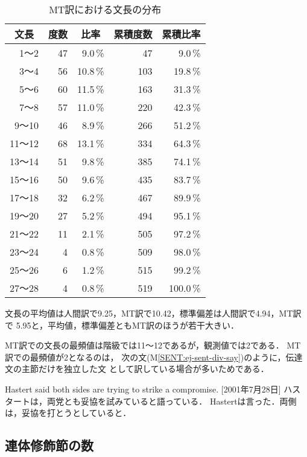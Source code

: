 \begin{table}[htbp]
\caption{MT訳における文長の分布}
\label{tab:sent-length-mt}
\begin{center}
\begin{tabular}{|r||r|r|r|r|}\hline
\multicolumn{1}{|c||}{文長} & \multicolumn{1}{c|}{度数} & 
\multicolumn{1}{c|}{比率} & \multicolumn{1}{c|}{累積度数} & 
\multicolumn{1}{c|}{累積比率} \\\hline\hline
   1〜2 & 47 &  9.0\,\% &  47 &  9.0\,\% \\
   3〜4 & 56 & 10.8\,\% & 103 & 19.8\,\% \\
   5〜6 & 60 & 11.5\,\% & 163 & 31.3\,\% \\
   7〜8 & 57 & 11.0\,\% & 220 & 42.3\,\% \\
  9〜10 & 46 &  8.9\,\% & 266 & 51.2\,\% \\
 11〜12 & 68 & 13.1\,\% & 334 & 64.3\,\% \\
 13〜14 & 51 &  9.8\,\% & 385 & 74.1\,\% \\
 15〜16 & 50 &  9.6\,\% & 435 & 83.7\,\% \\
 17〜18 & 32 &  6.2\,\% & 467 & 89.9\,\% \\
 19〜20 & 27 &  5.2\,\% & 494 & 95.1\,\% \\
 21〜22 & 11 &  2.1\,\% & 505 & 97.2\,\% \\
 23〜24 &  4 &  0.8\,\% & 509 & 98.0\,\% \\
 25〜26 &  6 &  1.2\,\% & 515 & 99.2\,\% \\
 27〜28 &  4 &  0.8\,\% & 519 & 100.0\,\% \\\hline
\end{tabular}
\end{center}
\end{table}

文長の平均値は人間訳で9.25，MT訳で10.42，標準偏差は人間訳で4.94，MT訳で
5.95と，平均値，標準偏差ともMT訳のほうが若干大きい．

MT訳での文長の最頻値は階級では11〜12であるが，観測値では2である．
MT訳での最頻値が2となるのは，
次の文(M\ref{SENT:ej-sent-div-say})のように，伝達文の主節だけを独立した文
として訳している場合が多いためである．
\begin{SENT2}
\sentE Hastert said both sides are trying to strike a compromise. [2001年7月28日]
\sentH ハスタートは，両党とも妥協を試みていると語っている．
\sentM Hastertは言った．両側は，妥協を打とうとしていると．
\label{SENT:ej-sent-div-say}
\end{SENT2}


\subsection{連体修飾節の数}
\label{sec:result:rentai}

